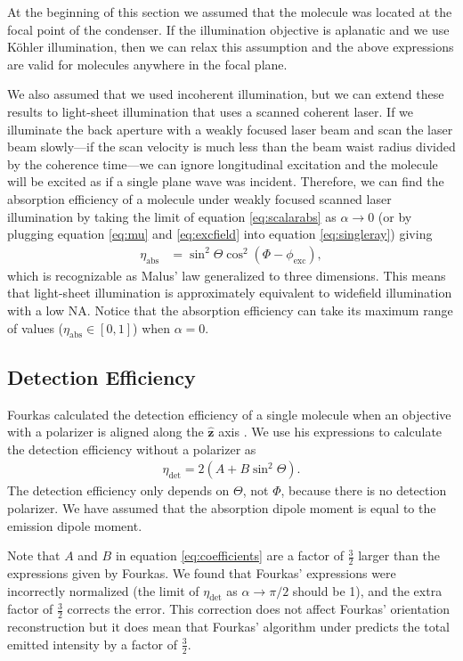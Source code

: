 \documentclass[10pt]{article}
\providecommand{\mh}[1]{\mathbf{\hat{#1}}}
\begin{document}
At the beginning of this section we assumed that the molecule was located at the
focal point of the condenser. If the illumination objective is aplanatic and we
use K\"ohler illumination, then we can relax this assumption and the above
expressions are valid for molecules anywhere in the focal plane.

We also assumed that we used incoherent illumination, but we can extend these
results to light-sheet illumination that uses a scanned coherent laser. If we
illuminate the back aperture with a weakly focused laser beam and scan the laser
beam slowly---if the scan velocity is much less than the beam waist radius
divided by the coherence time---we can ignore longitudinal excitation and the
molecule will be excited as if a single plane wave was incident. Therefore, we
can find the absorption efficiency of a molecule under weakly focused scanned
laser illumination by taking the limit of equation \ref{eq:scalarabs} as
$\alpha \rightarrow 0$ (or by plugging equation \ref{eq:mu} and
\ref{eq:excfield} into equation \ref{eq:singleray}) giving
\begin{align}
  \eta_{\text{abs}} &= \sin^2\Theta\cos^2(\Phi - \phi_{\text{exc}}),
\end{align}
which is recognizable as Malus' law generalized to three dimensions. This means
that light-sheet illumination is approximately equivalent to widefield
illumination with a low NA. Notice that the absorption efficiency can take its
maximum range of values ($\eta_{\text{abs}} \in [0, 1]$) when $\alpha=0$.

\subsection{Detection Efficiency}\label{detection}
Fourkas calculated the detection efficiency of a single molecule when an
objective with a polarizer is aligned along the $\mh{z}$ axis
\cite{fourkas2001}. We use his expressions to calculate the detection efficiency
without a polarizer as
\begin{align}
  \eta_{\text{det}} = 2(A + B\sin^2\Theta). \label{eq:scalardet}
\end{align}
The detection efficiency only depends on $\Theta$, not $\Phi$, because there is
no detection polarizer. We have assumed that the absorption dipole moment is
equal to the emission dipole moment.

Note that $A$ and $B$ in equation \ref{eq:coefficients} are a factor of
$\frac{3}{2}$ larger than the expressions given by Fourkas. We found that
Fourkas' expressions were incorrectly normalized (the limit of
$\eta_{\text{det}}$ as $\alpha\rightarrow \pi/2$ should be 1), and the extra
factor of $\frac{3}{2}$ corrects the error. This correction does not affect
Fourkas' orientation reconstruction but it does mean that Fourkas' algorithm
under predicts the total emitted intensity by a factor of $\frac{3}{2}$.
\end{document}
